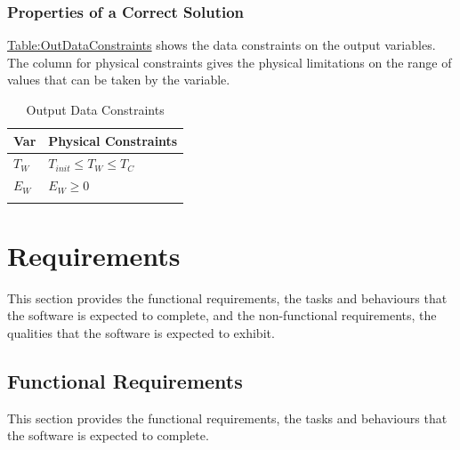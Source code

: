 \documentclass[12pt]{article}
\begin{document}
\subsubsection{Properties of a Correct Solution}
\label{Sec:CorSolProps}
\hyperref[Table:OutDataConstraints]{Table:OutDataConstraints} shows the data constraints on the output variables. The column for physical constraints gives the physical limitations on the range of values that can be taken by the variable.

\begin{longtable}{l l}
\toprule
\textbf{Var} & \textbf{Physical Constraints}
\\
\midrule
\endhead
${T_{W}}$ & ${T_{init}}\leq{}{T_{W}}\leq{}{T_{C}}$
\\
${E_{W}}$ & ${E_{W}}\geq{}0$
\\
\bottomrule
\caption{Output Data Constraints}
\label{Table:OutDataConstraints}
\end{longtable}
\section{Requirements}
\label{Sec:Requirements}
This section provides the functional requirements, the tasks and behaviours that the software is expected to complete, and the non-functional requirements, the qualities that the software is expected to exhibit.

\subsection{Functional Requirements}
\label{Sec:FRs}
This section provides the functional requirements, the tasks and behaviours that the software is expected to complete.
\end{document}
